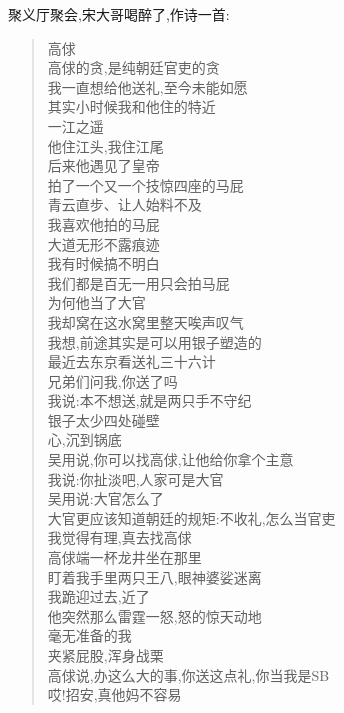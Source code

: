 ﻿\documentclass[12pt]{article}
\begin{document}
聚义厅聚会,宋大哥喝醉了,作诗一首:
{\footnotesize \it
\begin{verse}
高俅\\

高俅的贪,是纯朝廷官吏的贪\\
我一直想给他送礼,至今未能如愿\\
其实小时候我和他住的特近\\
一江之遥\\
他住江头,我住江尾\\
后来他遇见了皇帝\\
拍了一个又一个技惊四座的马屁\\
青云直步、让人始料不及\\
我喜欢他拍的马屁\\
大道无形不露痕迹\\
我有时候搞不明白\\
我们都是百无一用只会拍马屁\\
为何他当了大官\\
我却窝在这水窝里整天唉声叹气\\
我想,前途其实是可以用银子塑造的  \\
最近去东京看送礼三十六计\\
兄弟们问我,你送了吗\\
我说:本不想送,就是两只手不守纪\\
银子太少四处碰壁\\
心,沉到锅底\\
吴用说,你可以找高俅,让他给你拿个主意\\
我说:你扯淡吧,人家可是大官\\
吴用说:大官怎么了\\
大官更应该知道朝廷的规矩:不收礼,怎么当官吏 \\
我觉得有理,真去找高俅\\
高俅端一杯龙井坐在那里\\
盯着我手里两只王八,眼神婆娑迷离\\
我跪迎过去,近了 \\
他突然那么雷霆一怒,怒的惊天动地\\
毫无准备的我\\
夹紧屁股,浑身战栗\\
高俅说,办这么大的事,你送这点礼,你当我是SB\\
哎!招安,真他妈不容易\\
\end{verse}
}

\section{}
\end{document}
